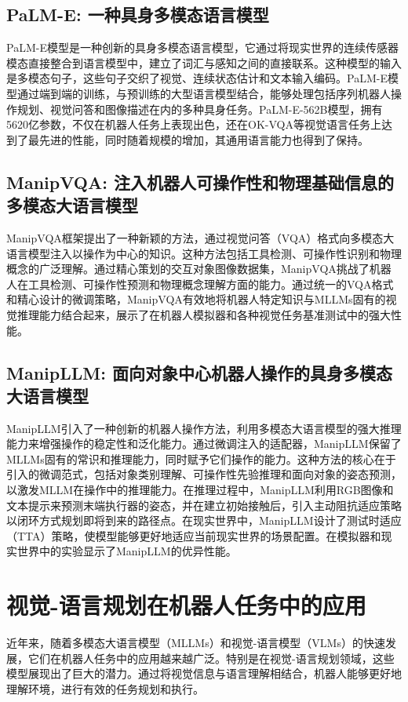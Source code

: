\documentclass[a4paper]{article}
\begin{document}
\subsection{PaLM-E: 一种具身多模态语言模型}
PaLM-E模型是一种创新的具身多模态语言模型，它通过将现实世界的连续传感器模态直接整合到语言模型中，建立了词汇与感知之间的直接联系。这种模型的输入是多模态句子，这些句子交织了视觉、连续状态估计和文本输入编码。PaLM-E模型通过端到端的训练，与预训练的大型语言模型结合，能够处理包括序列机器人操作规划、视觉问答和图像描述在内的多种具身任务。PaLM-E-562B模型，拥有5620亿参数，不仅在机器人任务上表现出色，还在OK-VQA等视觉语言任务上达到了最先进的性能，同时随着规模的增加，其通用语言能力也得到了保持。

\subsection{ManipVQA: 注入机器人可操作性和物理基础信息的多模态大语言模型}
ManipVQA框架提出了一种新颖的方法，通过视觉问答（VQA）格式向多模态大语言模型注入以操作为中心的知识。这种方法包括工具检测、可操作性识别和物理概念的广泛理解。通过精心策划的交互对象图像数据集，ManipVQA挑战了机器人在工具检测、可操作性预测和物理概念理解方面的能力。通过统一的VQA格式和精心设计的微调策略，ManipVQA有效地将机器人特定知识与MLLMs固有的视觉推理能力结合起来，展示了在机器人模拟器和各种视觉任务基准测试中的强大性能。

\subsection{ManipLLM: 面向对象中心机器人操作的具身多模态大语言模型}
ManipLLM引入了一种创新的机器人操作方法，利用多模态大语言模型的强大推理能力来增强操作的稳定性和泛化能力。通过微调注入的适配器，ManipLLM保留了MLLMs固有的常识和推理能力，同时赋予它们操作的能力。这种方法的核心在于引入的微调范式，包括对象类别理解、可操作性先验推理和面向对象的姿态预测，以激发MLLM在操作中的推理能力。在推理过程中，ManipLLM利用RGB图像和文本提示来预测末端执行器的姿态，并在建立初始接触后，引入主动阻抗适应策略以闭环方式规划即将到来的路径点。在现实世界中，ManipLLM设计了测试时适应（TTA）策略，使模型能够更好地适应当前现实世界的场景配置。在模拟器和现实世界中的实验显示了ManipLLM的优异性能。
\section{视觉-语言规划在机器人任务中的应用}
近年来，随着多模态大语言模型（MLLMs）和视觉-语言模型（VLMs）的快速发展，它们在机器人任务中的应用越来越广泛。特别是在视觉-语言规划领域，这些模型展现出了巨大的潜力。通过将视觉信息与语言理解相结合，机器人能够更好地理解环境，进行有效的任务规划和执行。
\end{document}
